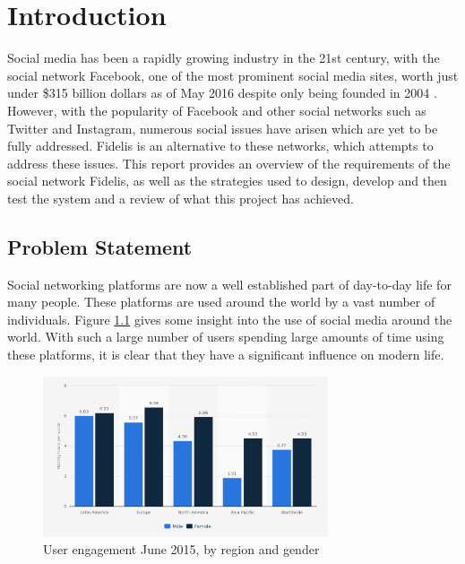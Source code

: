 \chapter{Introduction}
\label{Chapter:Introduction}

Social media has been a rapidly growing industry in the 21st century, with the social network Facebook, one of the most prominent social media sites, worth just under \$315 billion dollars as of May 2016 despite only being founded in 2004 \cite{Forbes:Facebook}. However, with the popularity of Facebook and other social networks such as Twitter and Instagram, numerous social issues have arisen which are yet to be fully addressed. Fidelis is an alternative to these networks, which attempts to address these issues. This report provides an overview of the requirements of the social network Fidelis, as well as the strategies used to design, develop and then test the system and a review of what this project has achieved.

\section{Problem Statement}
\label{Section:ProblemStatement}
Social networking platforms are now a well established part of day-to-day life for many people. These platforms are used around the world by a vast number of individuals. Figure \ref{fig:SocialMediaRegionGender} gives some insight into the use of social media around the world. With such a large number of users spending large amounts of time using these platforms, it is clear that they have a significant influence on modern life.

\begin{figure}[H]
  \centering
  \includegraphics[width=0.75\textwidth]{Images/Introduction/SocialMediaRegionGender}
  \caption{User engagement June 2015, by region and gender \cite{Statista:SocialMediaRegionGender}} \label{fig:SocialMediaRegionGender} 
\end{figure}

